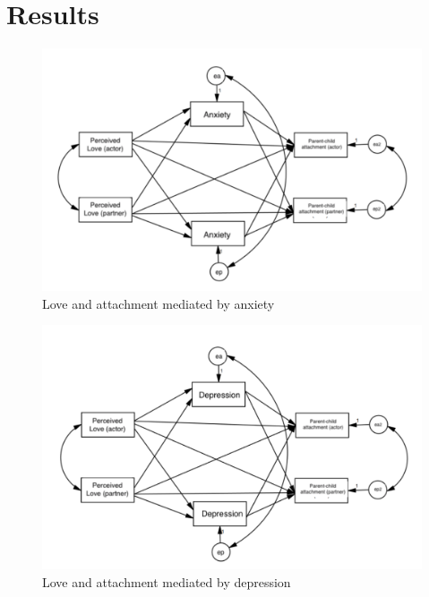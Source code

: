 \documentclass[man]{apa6}
\begin{document}
\hypertarget{results}{%
\section{Results}\label{results}}

\begin{figure}

{\centering \includegraphics[width=500px]{figure1} 

}

\caption{Love and attachment mediated by anxiety}\label{fig:unnamed-chunk-3}
\end{figure}

\begin{figure}

{\centering \includegraphics[width=500px]{figure2} 

}

\caption{Love and attachment mediated by depression}\label{fig:unnamed-chunk-4}
\end{figure}
\end{document}
